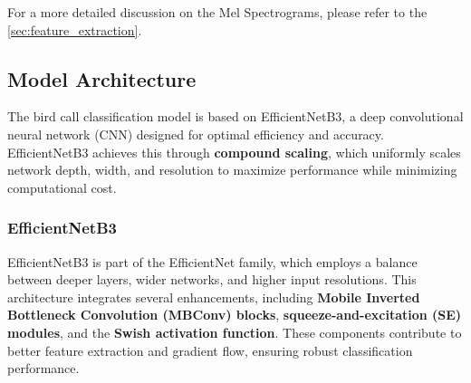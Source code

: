       For a more detailed discussion on the Mel Spectrograms, please refer to the \ref{sec:feature_extraction}.

      
      \subsection{Model Architecture}

      The bird call classification model is based on EfficientNetB3, a deep convolutional neural network (CNN) designed for optimal efficiency and accuracy. EfficientNetB3 achieves this through \textbf{compound scaling}, which uniformly scales network depth, width, and resolution to maximize performance while minimizing computational cost.
      
      \subsubsection{EfficientNetB3}
      EfficientNetB3 is part of the EfficientNet family, which employs a balance between deeper layers, wider networks, and higher input resolutions. This architecture integrates several enhancements, including \textbf{Mobile Inverted Bottleneck Convolution (MBConv) blocks}, \textbf{squeeze-and-excitation (SE) modules}, and the \textbf{Swish activation function}. These components contribute to better feature extraction and gradient flow, ensuring robust classification performance.
